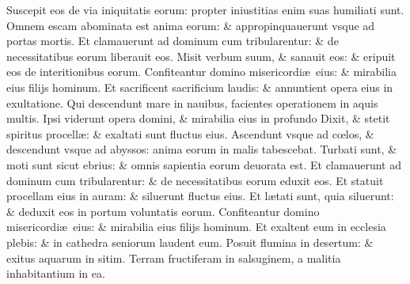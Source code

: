 \documentclass[a5paper,10pt]{book}
\def\ae{æ}
\def\oe{œ}
\begin{document}
\begin{multicols*}{2}
\newline \color{red} S\color{black}uscepit eos de via iniquitatis eorum: propter iniustitias enim suas humiliati sunt.
\newline \color{red} O\color{black}mnem escam abominata est anima eorum: \& appropinquauerunt vsque ad portas mortis.
\newline \color{red} E\color{black}t clamauerunt ad dominum cum tribularentur: \& de necessitatibus eorum liberauit eos.
\newline \color{red} M\color{black}isit verbum suum, \& sanauit eos: \& eripuit eos de interitionibus eorum.
\newline \color{red} C\color{black}onfiteantur domino misericordi\ae \ eius: \& mirabilia eius filijs hominum.
\newline \color{red} E\color{black}t sacrificent sacrificium laudis: \& annuntient opera eius in exultatione.
\newline \color{red} Q\color{black}ui descendunt mare in nauibus, facientes operationem in aquis multis.
\newline \color{red} I\color{black}psi viderunt opera domini, \& mirabilia eius in profundo
\newline \color{red} D\color{black}ixit, \& stetit spiritus procell\ae : \& exaltati sunt fluctus eius.
\newline \color{red} A\color{black}scendunt vsque ad c\oe los, \& descendunt vsque ad abyssos: anima eorum in malis tabescebat.
\newline \color{red} T\color{black}urbati sunt, \& moti sunt sicut ebrius: \& omnis sapientia eorum deuorata est.
\newline \color{red} E\color{black}t clamauerunt ad dominum cum tribularentur: \& de necessitatibus eorum eduxit eos.
\newline \color{red} E\color{black}t statuit procellam eius in auram: \& siluerunt fluctus eius.
\newline \color{red} E\color{black}t l\ae tati sunt, quia siluerunt: \& deduxit eos in portum voluntatis eorum.
\newline \color{red} C\color{black}onfiteantur domino misericordi\ae \ eius: \& mirabilia eius filijs hominum.
\newline \color{red} E\color{black}t exaltent eum in ecclesia plebis: \& in cathedra seniorum laudent eum.
\newline \color{red} P\color{black}osuit flumina in desertum: \& exitus aquarum in sitim.
\newline \color{red} T\color{black}erram fructiferam in salsuginem, a malitia inhabitantium in ea.

\end{multicols*}
\end{document}

